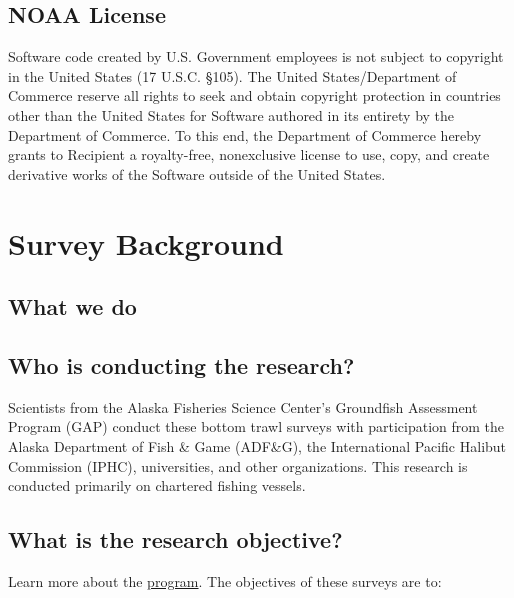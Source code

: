 \documentclass[
  letterpaper,
  oneside,
  open=any]{scrbook}
\begin{document}
\hypertarget{noaa-license}{%
\section*{NOAA License}\label{noaa-license}}


Software code created by U.S. Government employees is not subject to
copyright in the United States (17 U.S.C. §105). The United
States/Department of Commerce reserve all rights to seek and obtain
copyright protection in countries other than the United States for
Software authored in its entirety by the Department of Commerce. To this
end, the Department of Commerce hereby grants to Recipient a
royalty-free, nonexclusive license to use, copy, and create derivative
works of the Software outside of the United States.

\hypertarget{survey-background}{%
\chapter{Survey Background}\label{survey-background}}

\hypertarget{what-we-do}{%
\section{What we do}\label{what-we-do}}

\hypertarget{who-is-conducting-the-research}{%
\section{Who is conducting the
research?}\label{who-is-conducting-the-research}}

Scientists from the Alaska Fisheries Science Center's Groundfish
Assessment Program (GAP) conduct these bottom trawl surveys with
participation from the Alaska Department of Fish \& Game (ADF\&G), the
International Pacific Halibut Commission (IPHC), universities, and other
organizations. This research is conducted primarily on chartered fishing
vessels.

\hypertarget{what-is-the-research-objective}{%
\section{What is the research
objective?}\label{what-is-the-research-objective}}

Learn more about the
\href{https://www.fisheries.noaa.gov/alaska/science-data/groundfish-assessment-program-bottom-trawl-surveys}{program}.
The objectives of these surveys are to:
\end{document}
